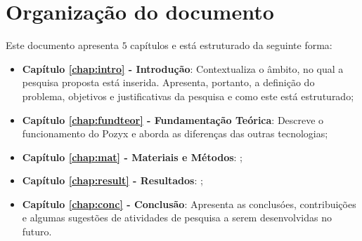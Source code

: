 \section{Organização do documento}
\label{section:organizacao}

Este documento apresenta $5$ capítulos e está estruturado da seguinte forma:

\begin{itemize}

  \item \textbf{Capítulo \ref{chap:intro} - Introdução}: Contextualiza o âmbito, no qual a pesquisa proposta está inserida. Apresenta, portanto, a definição do problema, objetivos e justificativas da pesquisa e como este \thetypeworkthree está estruturado;
  \item \textbf{Capítulo \ref{chap:fundteor} - Fundamentação Teórica}: Descreve o funcionamento do Pozyx e aborda as diferenças das outras tecnologias;
  \item \textbf{Capítulo \ref{chap:mat} - Materiais e Métodos}: ;
  \item \textbf{Capítulo \ref{chap:result} - Resultados}: ;
  \item \textbf{Capítulo \ref{chap:conc} - Conclusão}: Apresenta as conclusóes, contribuições e algumas sugestões de atividades de pesquisa a serem desenvolvidas no futuro.

\end{itemize}
